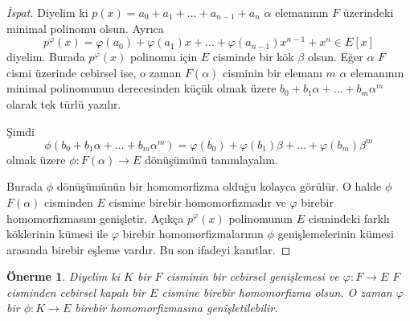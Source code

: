 \documentclass[draft]{article}
\newtheorem{prop}[thm]{Önerme}
\theoremstyle{definition}
\theoremstyle{remark}
\begin{document}
            \begin{proof}[İspat]
                Diyelim ki $p(x) = a_0 + a_1 + \dots + a_{n - 1} + a_n$ $\alpha$ elemanının $F$ üzerindeki minimal polinomu olsun. Ayrıca
                \begin{equation*}
                    p^\varphi(x) = \varphi(a_0) + \varphi(a_1)x + \dots + \varphi(a_{n - 1})x^{n - 1} + x^n \in E[x]
                \end{equation*}
                diyelim. Burada $p^\varphi(x)$ polinomu için $E$ cisminde bir kök $\beta$ olsun. Eğer $\alpha$ $F$ cismi üzerinde cebirsel ise, o zaman $F(\alpha)$ cisminin bir elemanı $m$ $\alpha$ elemanının minimal polinomunun derecesinden küçük olmak üzere $b_0 + b_1\alpha + \dots + b_m\alpha^m$ olarak tek türlü yazılır.\par
                Şimdi
                \begin{equation*}
                    \phi(b_0 + b_1\alpha + \dots + b_m\alpha^m) = \varphi(b_0) + \varphi(b_1)\beta + \dots + \varphi(b_m)\beta^m
                \end{equation*}
                olmak üzere $\phi: F(\alpha) \to E$ dönüşümünü tanımlayalım.\par
                Burada $\phi$ dönüşümünün bir homomorfizma olduğu kolayca görülür. O halde $\phi$ $F(\alpha)$ cisminden $E$ cismine birebir homomorfizmadır ve $\varphi$ birebir homomorfizmasını genişletir. Açıkça $p^\varphi(x)$ polinomunun $E$ cismindeki farklı köklerinin kümesi ile $\varphi$ birebir homomorfizmalarının $\phi$ genişlemelerinin kümesi arasında birebir eşleme vardır. Bu son ifadeyi kanıtlar.
            \end{proof}
            
            \begin{prop}
                Diyelim ki $K$ bir $F$ cisminin bir cebirsel genişlemesi ve $\varphi: F \to E$ $F$ cisminden cebirsel kapalı bir $E$ cismine birebir homomorfizma olsun. O zaman $\varphi$ bir $\phi: K \to E$ birebir homomorfizmasına genişletilebilir.
            \end{prop}
            
\end{document}
